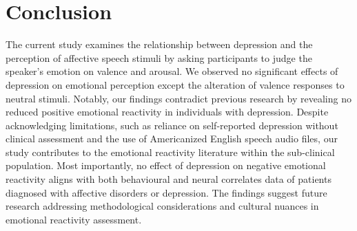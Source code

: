 \documentclass{Interspeech2024}
\begin{document}
\section{Conclusion}
The current study examines the relationship between depression and the perception of affective speech stimuli by asking participants to judge the speaker's emotion on valence and arousal. We observed no significant effects of depression on emotional perception except the alteration of valence responses to neutral stimuli. Notably, our findings contradict previous research by revealing no reduced positive emotional reactivity in individuals with depression. Despite acknowledging limitations, such as reliance on self-reported depression without clinical assessment and the use of Americanized English speech audio files, our study contributes to the emotional reactivity literature within the sub-clinical population. Most importantly, no effect of depression on negative emotional reactivity aligns with both behavioural and neural correlates data of patients diagnosed with affective disorders or depression. The findings suggest future research addressing methodological considerations and cultural nuances in emotional reactivity assessment.

\end{document}
